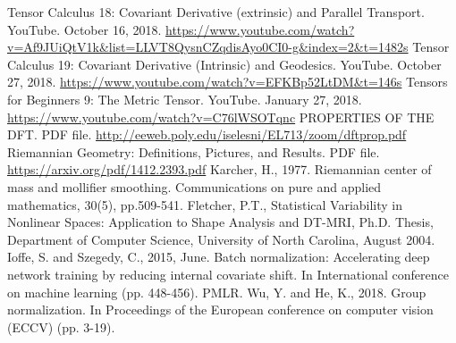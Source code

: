 \documentclass[a4paper]{article}
\theoremstyle{definition}
\theoremstyle{plain}
\begin{document}
\begin{thebibliography}{99}
 Tensor Calculus 18: Covariant Derivative (extrinsic) and Parallel Transport. YouTube. October 16, 2018. \url{https://www.youtube.com/watch?v=Af9JUiQtV1k&list=LLVT8QysnCZqdisAyo0CI0-g&index=2&t=1482s}
 Tensor Calculus 19: Covariant Derivative (Intrinsic) and Geodesics. YouTube. October 27, 2018. \url{https://www.youtube.com/watch?v=EFKBp52LtDM&t=146s}
 Tensors for Beginners 9: The Metric Tensor. YouTube. January 27, 2018. \url{https://www.youtube.com/watch?v=C76lWSOTqnc}
 PROPERTIES OF THE DFT. PDF file. \url{http://eeweb.poly.edu/iselesni/EL713/zoom/dftprop.pdf}
 Riemannian Geometry: Definitions, Pictures, and Results. PDF file. \url{https://arxiv.org/pdf/1412.2393.pdf}
 Karcher, H., 1977. Riemannian center of mass and mollifier smoothing. Communications on pure and applied mathematics, 30(5), pp.509-541.
Fletcher, P.T., Statistical Variability in Nonlinear Spaces: Application to Shape Analysis and DT-MRI, Ph.D. Thesis, Department of Computer Science, University of North Carolina, August 2004.
Ioffe, S. and Szegedy, C., 2015, June. Batch normalization: Accelerating deep network training by reducing internal covariate shift. In International conference on machine learning (pp. 448-456). PMLR.
Wu, Y. and He, K., 2018. Group normalization. In Proceedings of the European conference on computer vision (ECCV) (pp. 3-19).
\end{thebibliography}
\end{document}
